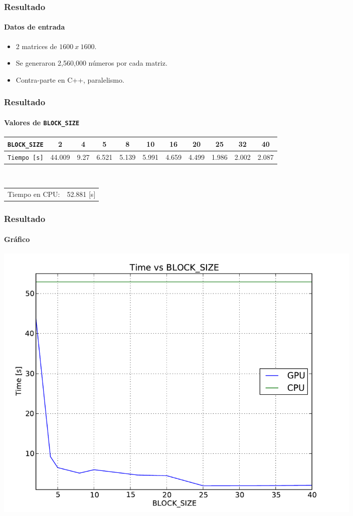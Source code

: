 \frame
{
\frametitle{Resultado}
\framesubtitle{Datos de entrada}
\begin{itemize}
	\item<1-> 2 matrices de $1600\ x\ 1600$.
	\item<2-> Se generaron 2,560,000 números  por cada matriz.
	\item<3-> Contra-parte en C++,  paralelismo.
\end{itemize}
}


\frame
{
\frametitle{Resultado}
\framesubtitle{Valores de \texttt{BLOCK\_SIZE}}
\begin{center}
	\tiny{
	\begin{tabular}{|l|c|c|c|c|c|c|c|c|c|c|}
		\hline
		\texttt{BLOCK\_SIZE} & 2 & 4 & 5 & 8 & 10 & 16 & 20 & 25 & 32 & 40 \\\hline
		\texttt{Tiempo [s]}  & 44.009 & 9.27 & 6.521 & 5.139 & 5.991 & 4.659 & 4.499 & 1.986 & 2.002 & 2.087 \\\hline
	\end{tabular}
	}
	\\
	\footnotesize
	\vspace{1cm}
	\begin{tabular}{cc}
		Tiempo en CPU: & 52.881 [s] \\
	\end{tabular}
\end{center}
}

\frame
{
\frametitle{Resultado}
\framesubtitle{Gráfico}
\begin{center}
	\includegraphics[width=0.8\textwidth]{../doc/img/plot-proyecto.pdf}
\end{center}
}
